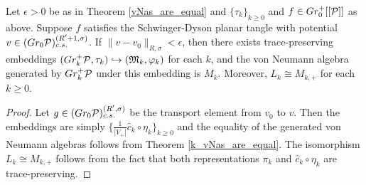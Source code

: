 \begin{cor}
Let $\epsilon>0$ be as in Theorem \ref{vNas_are_equal} and $\{\tau_k\}_{k\geq 0}$ and $f\in Gr_0^+[[\mathcal{P}]]$ as above. Suppose $f$ satisfies the Schwinger-Dyson planar tangle with potential $v\in (Gr_0\mathcal{P})^{(R'+1,\sigma)}_{c.s.}$. If $\|v-v_0\|_{R,\sigma}<\epsilon$, then there exists trace-preserving embeddings $(Gr_k^+\mathcal{P},\tau_k)\hookrightarrow (\mathfrak{M}_k,\varphi_k)$ for each $k$, and the von Neumann algebra generated by $Gr_k^+\mathcal{P}$ under this embedding is $M_k$. Moreover, $L_k\cong M_{k,+}$ for each $k\geq 0$.
\end{cor}
\begin{proof}
Let $g\in (Gr_0\mathcal{P})^{(R',\sigma)}_{c.s.}$ be the transport element from $v_0$ to $v$. Then the embeddings are simply $\{\frac{1}{|V_+|}\hat{c}_k\circ \eta_k\}_{k\geq 0}$ and the equality of the generated von Neumann algebras follows from Theorem \ref{k_vNas_are_equal}. The isomorphism $L_k\cong M_{k,+}$ follows from the fact that both representations $\pi_k$ and $\hat{c}_k\circ \eta_k$ are trace-preserving.
\end{proof}


